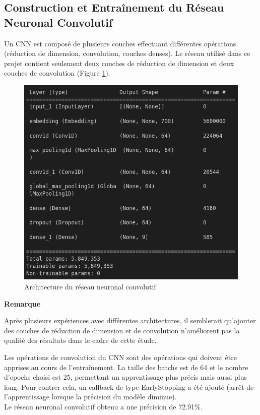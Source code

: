 \subsection{Construction et Entraînement du Réseau Neuronal Convolutif}
Un CNN est composé de plusieurs couches effectuant différentes opérations (réduction de dimension, convolution, couches denses). Le réseau utilisé dans ce projet contient seulement deux couches de réduction de dimension et deux couches de convolution (Figure \ref{architecture_cnn}).

\begin{figure}
    \center
    \includegraphics[scale=.3]{img/architecture_cnn.png}
    \caption{Architecture du réseau neuronal convolutif}
    \label{architecture_cnn}
\end{figure}

\noindent
\begin{minipage}[!hc]{0.12\textwidth}
   \textbf{Remarque}
\end{minipage}
\vrule\enskip\vrule\quad\begin{minipage}{\dimexpr 0.87\textwidth-0.8pt-1.5em}
Après plusieurs expériences avec différentes architectures, il semblerait qu'ajouter des couches de réduction de dimension et de convolution n'améliorent pas la qualité des résultats dans le cadre de cette étude.
\end{minipage}

Les opérations de convolution du CNN sont des opérations qui doivent être apprises au cours de l'entraînement. \cite{convolution} La taille des batchs est de 64 et le nombre d'epochs choisi est 25, permettant un apprentissage plus précis mais aussi plus long. Pour contrer cela, un callback de type \textsf{EarlyStopping} a été ajouté (arrêt de l'apprentissage lorsque la précision du modèle diminue).\\
Le réseau neuronal convolutif obtenu a une précision de 72.91\%.

